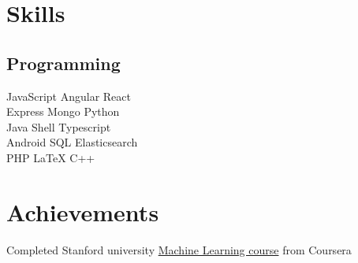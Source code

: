 \documentclass[]{font}
\begin{document}
%
%
\lastupdated

%
%

%
%

\begin{minipage}[t]{0.33\textwidth} 


\section{Skills}
\subsection{Programming}
JavaScript \textbullet{} Angular \textbullet{} React \\
Express \textbullet{}  Mongo \textbullet{} Python \\
Java \textbullet{} Shell \textbullet{} Typescript \\ 
Android \textbullet{} SQL \textbullet{} Elasticsearch \\
PHP \textbullet{} \LaTeX \textbullet{} C++\\
\sectionsep



\section{Achievements} 
\vspace{\topsep}
\textbullet{} Completed Stanford university \href{https://www.coursera.org/account/accomplishments/records/EJQWCKEBUSBD}{Machine Learning course} from Coursera \\
\sectionsep


\end{minipage}
\end{document}
